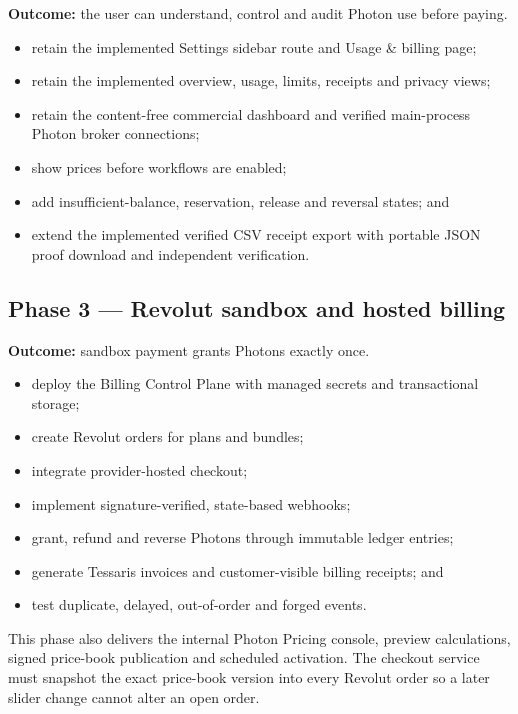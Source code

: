 \documentclass[11pt]{article}
\begin{document}
\textbf{Outcome:} the user can understand, control and audit Photon use before paying.

\begin{itemize}
  \item retain the implemented Settings sidebar route and Usage \& billing page;
  \item retain the implemented overview, usage, limits, receipts and privacy views;
  \item retain the content-free commercial dashboard and verified main-process Photon broker connections;
  \item show prices before workflows are enabled;
  \item add insufficient-balance, reservation, release and reversal states; and
  \item extend the implemented verified CSV receipt export with portable JSON proof download and independent verification.
\end{itemize}

\subsection{Phase 3 --- Revolut sandbox and hosted billing}

\textbf{Outcome:} sandbox payment grants Photons exactly once.

\begin{itemize}
  \item deploy the Billing Control Plane with managed secrets and transactional storage;
  \item create Revolut orders for plans and bundles;
  \item integrate provider-hosted checkout;
  \item implement signature-verified, state-based webhooks;
  \item grant, refund and reverse Photons through immutable ledger entries;
  \item generate Tessaris invoices and customer-visible billing receipts; and
  \item test duplicate, delayed, out-of-order and forged events.
\end{itemize}

This phase also delivers the internal Photon Pricing console, preview calculations, signed price-book publication and scheduled activation. The checkout service must snapshot the exact price-book version into every Revolut order so a later slider change cannot alter an open order.
\end{document}
